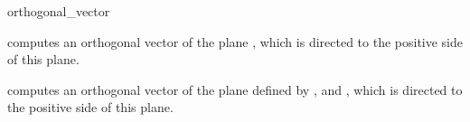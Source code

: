 \begin{ccRefFunction}{orthogonal_vector}

 {computes an orthogonal vector of the plane , which is directed to 
  the positive side of this plane.}

 {computes an orthogonal vector of the plane defined by ,  and ,
  which is directed to the positive side of this plane.}


\end{ccRefFunction}

